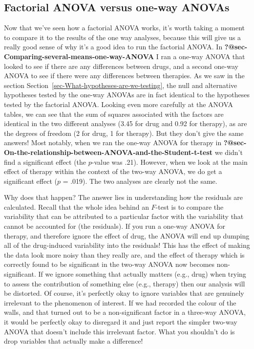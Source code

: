 \documentclass[
  a4paper,
]{book}
\begin{document}
\hypertarget{factorial-anova-versus-one-way-anovas}{%
\subsection{Factorial ANOVA versus one-way
ANOVAs}\label{factorial-anova-versus-one-way-anovas}}

Now that we've seen how a factorial ANOVA works, it's worth taking a
moment to compare it to the results of the one way analyses, because
this will give us a really good sense of why it's a good idea to run the
factorial ANOVA. In \textbf{?@sec-Comparing-several-means-one-way-ANOVA}
I ran a one-way ANOVA that looked to see if there are any differences
between drugs, and a second one-way ANOVA to see if there were any
differences between therapies. As we saw in the section
Section~\ref{sec-What-hypotheses-are-we-testing}, the null and
alternative hypotheses tested by the one-way ANOVAs are in fact
identical to the hypotheses tested by the factorial ANOVA. Looking even
more carefully at the ANOVA tables, we can see that the sum of squares
associated with the factors are identical in the two different analyses
(3.45 for drug and 0.92 for therapy), as are the degrees of freedom (2
for drug, 1 for therapy). But they don't give the same answers! Most
notably, when we ran the one-way ANOVA for therapy in
\textbf{?@sec-On-the-relationship-between-ANOVA-and-the-Student-t-test}
we didn't find a significant effect (the \(p\)-value was .21). However,
when we look at the main effect of therapy within the context of the
two-way ANOVA, we do get a significant effect (\(p\) = .019). The two
analyses are clearly not the same.

Why does that happen? The answer lies in understanding how the residuals
are calculated. Recall that the whole idea behind an \(F\)-test is to
compare the variability that can be attributed to a particular factor
with the variability that cannot be accounted for (the residuals). If
you run a one-way ANOVA for therapy, and therefore ignore the effect of
drug, the ANOVA will end up dumping all of the drug-induced variability
into the residuals! This has the effect of making the data look more
noisy than they really are, and the effect of therapy which is correctly
found to be significant in the two-way ANOVA now becomes
non-significant. If we ignore something that actually matters (e.g.,
drug) when trying to assess the contribution of something else (e.g.,
therapy) then our analysis will be distorted. Of course, it's perfectly
okay to ignore variables that are genuinely irrelevant to the phenomenon
of interest. If we had recorded the colour of the walls, and that turned
out to be a non-significant factor in a three-way ANOVA, it would be
perfectly okay to disregard it and just report the simpler two-way ANOVA
that doesn't include this irrelevant factor. What you shouldn't do is
drop variables that actually make a difference!
\end{document}
